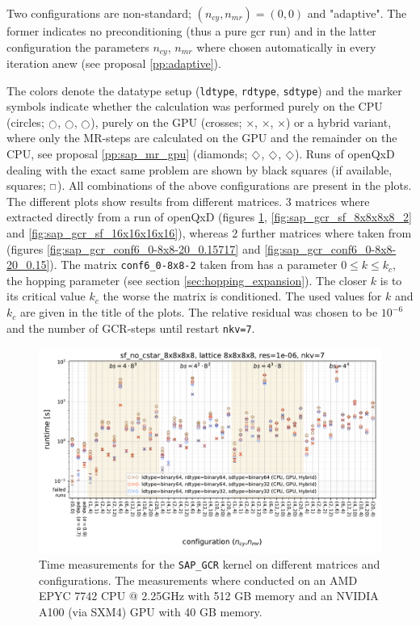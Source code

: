 \documentclass{article}
\DeclareRobustCommand{\diamond}{%
  \mathbin{\text{\scalebox{.75}{\rotatebox[origin=c]{45}{$\Box$}}}}%
}
\DeclareRobustCommand{\msquare}{%
  \mathbin{\text{\scalebox{.75}{$\Box$}}}%
}
\DeclareRobustCommand{\mcirc}{%
  \mathbin{\text{\scalebox{.75}{$\bigcirc$}}}%
}
\theoremstyle{plain} %
\theoremstyle{convention} %
\theoremstyle{remark} %
\def\code#1{\texttt{#1}}
\numberwithin{equation}{section}
\begin{document}
Two configurations are non-standard; $(n_{cy}, n_{mr}) = (0,0)$ and "adaptive". The former indicates no preconditioning (thus a pure \acrshort{gcr} run) and in the latter configuration the parameters $n_{cy}$, $n_{mr}$ where chosen automatically in every iteration anew (see proposal \ref{pp:adaptive}).


The colors denote the datatype setup (\code{ldtype}, \code{rdtype}, \code{sdtype}) and the marker symbols indicate whether the calculation was performed purely on the CPU (circles; \textcolor{cbrown}{$\mcirc$}, \textcolor{cred}{$\mcirc$}, \textcolor{cblue}{$\mcirc$}), purely on the GPU (crosses; \textcolor{cbrown}{$\times$}, \textcolor{cred}{$\times$}, \textcolor{cblue}{$\times$}) or a hybrid variant, where only the MR-steps are calculated on the GPU and the remainder on the CPU, see proposal \ref{pp:sap_mr_gpu} (diamonds; \textcolor{cbrown}{$\diamond$}, \textcolor{cred}{$\diamond$}, \textcolor{cblue}{$\diamond$}). Runs of openQxD dealing with the exact same problem are shown by black squares (if available, squares; $\msquare$). All combinations of the above configurations are present in the plots. The different plots show results from different matrices. \num{3} matrices where extracted directly from a run of openQxD (figures \ref{fig:sap_gcr_sf_8x8x8x8}, \ref{fig:sap_gcr_sf_8x8x8x8_2} and \ref{fig:sap_gcr_sf_16x16x16x16}), whereas \num{2} further matrices where taken from \cite{davis2011} (figures \ref{fig:sap_gcr_conf6_0-8x8-20_0.15717} and \ref{fig:sap_gcr_conf6_0-8x8-20_0.15}). The matrix \code{conf6\_0-8x8-2} taken from \cite{davis2011} has a parameter $0 \le k \le k_c$, the hopping parameter (see section \ref{sec:hopping_expansion}). The closer $k$ is to its critical value $k_c$ the worse the matrix is conditioned. The used values for $k$ and $k_c$ are given in the title of the plots. The relative residual was chosen to be $10^{-6}$ and the number of GCR-steps until restart \code{nkv=7}.

\begin{figure}[h]
    \centering
    \includegraphics[width=1.0\textwidth]{plots/sap_gcr_sf_no_cstar_8x8x8x8_lattice_8x8x8x8_res=1e-06_nkv=7}
    \caption{Time measurements for the \code{SAP\_GCR} kernel on different matrices and configurations. The measurements where conducted on an AMD EPYC 7742 CPU @ 2.25GHz with 512 GB memory and an NVIDIA A100 (via SXM4) GPU with 40 GB memory.}
    \label{fig:sap_gcr0}
    \label{fig:sap_gcr_start}
    \label{fig:sap_gcr_sf_8x8x8x8}
\end{figure}
\end{document}
